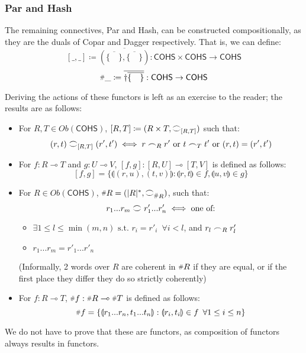 \documentclass[11pt, oneside]{article}
\theoremstyle{plain}
\theoremstyle{definition}
\let\originaldagger\dagger
\renewcommand{\dag}{\mathord{\originaldagger}}
\newcommand{\hash}{\mathord{\raisebox{0.3ex}{\scalebox{0.7}{$\mathstrut \# $}}}}
\newcommand{\lp}{\llparenthesis}
\newcommand{\rp}{\rrparenthesis}
\newcommand{\cohs}{{\mathsf{COHS}}}
\newcommand{\coh}[1][]{\mathrel{\vcenter{\offinterlineskip\hbox{$\frown$}\vskip0.2ex\hbox{$\smile$}}_{\ifx\\#1\\\else#1\fi}}}
\newcommand{\scoh}[1][]{\mathrel{\frown}_{\ifx\\#1\\\else#1\fi}}
\begin{document}
\subsubsection{Par and Hash}
The remaining connectives, Par and Hash, can be constructed compositionally, as they are the duals of Copar and Dagger respectively.
That is, we can define:
$$[\_,\_]\coloneqq\overline{(\overline{\{\quad\}},\overline{\{\quad\}})}:\cohs\times\cohs\to\cohs$$
$$\hash \_\coloneqq\overline{\dag\overline{\{\quad\}}}:\cohs\to\cohs$$

Deriving the actions of these functors is left as an exercise to the reader; the results are as follows:

\begin{itemize}
    \item
    For $R,T\in Ob(\cohs)$, $[R,T] \coloneqq (R\times T,\coh[{[R,T]}])$ such that:
    $$(r,t)\coh[{[R,T]}](r',t')\iff r\scoh[R]r'\text{ or }t\scoh[T]t'\text{ or }(r,t)=(r',t')$$

    \item
    For $f:R\multimap T$ and $g:U\multimap V$, 
    $[f,g]:[R,U]\multimap[T,V]$ is defined as follows:
    $$[f,g]=\{\lp(r,u),(t,v)\rp:\lp r,t\rp\in f,\lp u,v\rp\in g\}$$

    \item
        For $R\in Ob(\cohs)$, $\hash R=(|R|^*,\coh[\hash R])$, such that:
        $$r_1...r_m \coh r'_1...r'_n \iff \text{one of:}$$

        \begin{itemize}
            \item
            $\exists 1\leq l \leq \min(m,n) \text{ s.t. } r_i=r'_i \enspace\forall i<l$, and $r_l \scoh[R] r'_l$

            \item
            $r_1...r_m=r'_1...r'_n$
        \end{itemize}

        (Informally, 2 words over $R$ are coherent in $\hash R$ if they are equal, or if the first place they differ they do so strictly coherently)

        \item
        For $f:R\multimap T$, $\hash f:\hash R\multimap\hash T$ is defined as follows:
        $$\hash f=\{\lp r_1...r_n,t_1...t_n\rp:\lp r_i,t_i\rp\in f\enspace\forall 1\le i\le n\}$$
\end{itemize}

We do not have to prove that these are functors, as composition of functors always results in functors.
\end{document}

